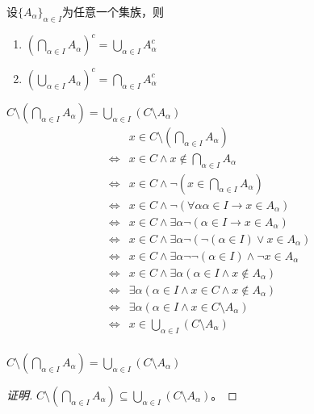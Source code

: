 \documentclass{beamer}
\begin{document}
\begin{CJK*}{UTF8}{gbsn}
\begin{frame}
  \begin{Thm}
    设$\{A_{\alpha}\}_{\alpha \in I}$为任意一个集族，则
    \begin{enumerate}
    \item $(\bigcap_{\alpha \in I}A_{\alpha})^c=\bigcup_{\alpha\in I}A_{\alpha}^c$
    \item $(\bigcup_{\alpha \in I}A_{\alpha})^c=\bigcap_{\alpha\in I}A_{\alpha}^c$
    \end{enumerate}
    \end{Thm}
\end{frame}
\begin{frame}
  $C\setminus(\bigcap_{\alpha \in I}A_{\alpha})=\bigcup_{\alpha\in I}(C\setminus A_{\alpha})$
  \pause
  \begin{equation*}
    \begin{split}
      &x \in C\setminus (\bigcap_{\alpha \in I}A_{\alpha})\\
      \Leftrightarrow &x \in C \land x \notin \bigcap_{\alpha \in I}A_{\alpha}\\
      \Leftrightarrow &x \in C \land \lnot (x \in \bigcap_{\alpha \in I}A_{\alpha})\\
      \Leftrightarrow &x \in C \land \lnot (\forall \alpha \alpha \in I \to x \in A_{\alpha})\\
      \Leftrightarrow &x \in C \land \exists \alpha \lnot (\alpha \in I \to x \in A_{\alpha})\\
      \Leftrightarrow &x \in C \land \exists \alpha \lnot (\lnot (\alpha \in I) \lor x \in A_{\alpha})\\
      \Leftrightarrow &x \in C \land \exists \alpha \lnot \lnot (\alpha \in I) \land \lnot x\in A_{\alpha}\\
      \Leftrightarrow &x \in C \land \exists \alpha (\alpha \in I \land x\notin A_{\alpha})\\
      \Leftrightarrow &\exists \alpha (\alpha \in I \land x\in C \land x \notin A_{\alpha})\\
      \Leftrightarrow &\exists \alpha (\alpha \in I \land x\in C\setminus A_{\alpha})\\
      \Leftrightarrow &x \in \bigcup_{\alpha \in I} (C\setminus A_{\alpha}) \\
    \end{split}
  \end{equation*}
\end{frame}

\begin{frame}
  $C\setminus(\bigcap_{\alpha \in I}A_{\alpha})=\bigcup_{\alpha\in I}(C\setminus A_{\alpha})$
  \begin{proof}[证明]
    \justifying\let\raggedright\justifying
{}$C\setminus(\bigcap_{\alpha \in I}A_{\alpha})\subseteq \bigcup_{\alpha\in I}(C\setminus A_{\alpha})$。


\end{proof}
\end{frame}
\end{CJK*}
\end{document}
